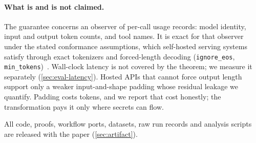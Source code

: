 \paragraph{What is and is not claimed.} The guarantee concerns an observer of per-call usage records: model identity, input and output token counts, and tool names. It is exact for that observer under the stated conformance assumptions, which self-hosted serving systems satisfy through exact tokenizers and forced-length decoding (\texttt{ignore\_eos}, \texttt{min\_tokens})~\cite{vllm2026sampling,llamacpp2026server}. Wall-clock latency is not covered by the theorem; we measure it separately (\cref{sec:eval-latency}). Hosted APIs that cannot force output length support only a weaker input-and-shape padding whose residual leakage we quantify. Padding costs tokens, and we report that cost honestly; the transformation pays it only where secrets can flow.

All code, proofs, workflow ports, datasets, raw run records and analysis scripts are released with the paper (\cref{sec:artifact}).
